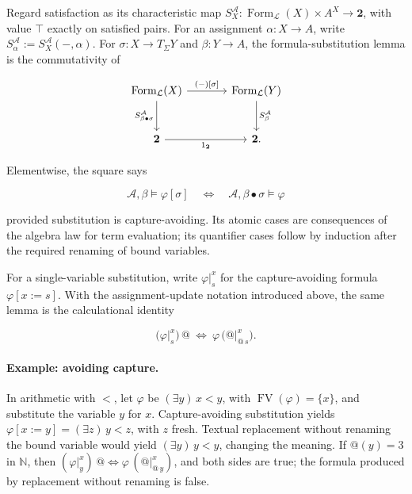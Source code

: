 \documentclass[11pt]{article}
\makeatletter
\newcommand{\atsign}{\mathord{@}}
\theoremstyle{definition}
\makeatother
\begin{document}
Regard satisfaction as its characteristic map
\(S_X^{\mathcal A}:\operatorname{Form}_{\mathcal L}(X)\times A^X
\to\mathbf 2\), with value \(\top\) exactly on satisfied pairs. For an
assignment \(\alpha:X\to A\), write
\(S_\alpha^{\mathcal A}:=S_X^{\mathcal A}(-,\alpha)\). For
\(\sigma:X\to T_\Sigma Y\) and \(\beta:Y\to A\), the formula-substitution
lemma is the commutativity of

\[
\begin{tikzcd}[row sep=large,column sep=large]
\operatorname{Form}_{\mathcal L}(X)
  \arrow[r,"{(-)[\sigma]}"]
  \arrow[d,swap,"S_{\beta\bullet\sigma}^{\mathcal A}"] &
\operatorname{Form}_{\mathcal L}(Y)
  \arrow[d,"S_\beta^{\mathcal A}"] \\
\mathbf 2 \arrow[r,"1_{\mathbf 2}"'] & \mathbf 2.
\end{tikzcd}
\]

Elementwise, the square says

\[
\boxed{
\mathcal A,\beta\models\varphi[\sigma]
\quad\Longleftrightarrow\quad
\mathcal A,\beta\bullet\sigma\models\varphi
}
\]

provided substitution is capture-avoiding. Its atomic cases are
consequences of the algebra law for term evaluation; its quantifier
cases follow by induction after the required renaming of bound
variables.

For a single-variable substitution, write \(\varphi\vert_s^x\) for the
capture-avoiding formula \(\varphi[x:=s]\). With the assignment-update notation
introduced above, the same lemma is the calculational identity

\[
\boxed{
\bigl(\varphi\vert_s^x\bigr)\,\atsign
\ \Longleftrightarrow\ 
\varphi\,\bigl(\atsign\vert_{\atsign\,s}^x\bigr).
}
\]

\paragraph{Example: avoiding capture.}
In arithmetic with \(<\), let \(\varphi\) be \((\exists y)\,x<y\), with
\(\operatorname{FV}(\varphi)=\{x\}\), and substitute the variable \(y\) for \(x\).
Capture-avoiding substitution yields
\(\varphi[x:=y]=(\exists z)\,y<z\), with \(z\) fresh. Textual
replacement without renaming the bound variable would yield \((\exists y)\,y<y\), 
changing the meaning. If \(\atsign(y)=3\) in \(\mathbb N\), then
\((\varphi\vert_y^x)\,\atsign\Longleftrightarrow
\varphi\,(\atsign\vert_{\atsign\,y}^x)\), and both sides are true; the formula produced
by replacement without renaming is false.
\end{document}
